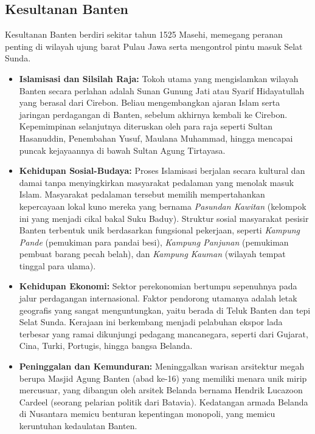 \documentclass[12pt, a4paper]{article}
\begin{document}
\subsection{Kesultanan Banten}
Kesultanan Banten berdiri sekitar tahun 1525 Masehi, memegang peranan penting di wilayah ujung barat Pulau Jawa serta mengontrol pintu masuk Selat Sunda.
\begin{itemize}
	\item \textbf{Islamisasi dan Silsilah Raja:} Tokoh utama yang mengislamkan wilayah Banten secara perlahan adalah Sunan Gunung Jati atau Syarif Hidayatullah yang berasal dari Cirebon. Beliau mengembangkan ajaran Islam serta jaringan perdagangan di Banten, sebelum akhirnya kembali ke Cirebon. Kepemimpinan selanjutnya diteruskan oleh para raja seperti Sultan Hasanuddin, Penembahan Yusuf, Maulana Muhammad, hingga mencapai puncak kejayaannya di bawah Sultan Agung Tirtayasa.
	\item \textbf{Kehidupan Sosial-Budaya:} Proses Islamisasi berjalan secara kultural dan damai tanpa menyingkirkan masyarakat pedalaman yang menolak masuk Islam. Masyarakat pedalaman tersebut memilih mempertahankan kepercayaan lokal kuno mereka yang bernama \textit{Pasundan Kawitan} (kelompok ini yang menjadi cikal bakal Suku Baduy). Struktur sosial masyarakat pesisir Banten terbentuk unik berdasarkan fungsional pekerjaan, seperti \textit{Kampung Pande} (pemukiman para pandai besi), \textit{Kampung Panjunan} (pemukiman pembuat barang pecah belah), dan \textit{Kampung Kauman} (wilayah tempat tinggal para ulama).
	\item \textbf{Kehidupan Ekonomi:} Sektor perekonomian bertumpu sepenuhnya pada jalur perdagangan internasional. Faktor pendorong utamanya adalah letak geografis yang sangat menguntungkan, yaitu berada di Teluk Banten dan tepi Selat Sunda. Kerajaan ini berkembang menjadi pelabuhan ekspor lada terbesar yang ramai dikunjungi pedagang mancanegara, seperti dari Gujarat, Cina, Turki, Portugis, hingga bangsa Belanda.
	\item \textbf{Peninggalan dan Kemunduran:} Meninggalkan warisan arsitektur megah berupa Masjid Agung Banten (abad ke-16) yang memiliki menara unik mirip mercusuar, yang dibangun oleh arsitek Belanda bernama Hendrik Lucazoon Cardeel (seorang pelarian politik dari Batavia). Kedatangan armada Belanda di Nusantara memicu benturan kepentingan monopoli, yang memicu keruntuhan kedaulatan Banten.
\end{itemize}
\end{document}
